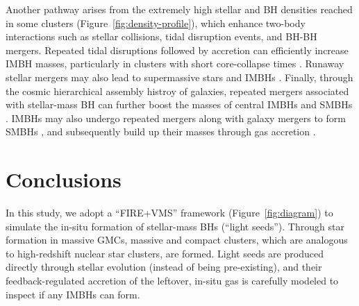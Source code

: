 \documentclass[twocolumn]{aastex631}
\begin{document}
Another pathway arises from the extremely high stellar and BH densities reached in some clusters (Figure~\ref{fig:density-profile}), which enhance two-body interactions such as stellar collisions, tidal disruption events, and BH-BH mergers. Repeated tidal disruptions followed by accretion can efficiently increase IMBH masses, particularly in clusters with short core-collapse times \citep{RantalaNaabLahen_2024MNRAS.531.3770R}. Runaway stellar mergers may also lead to supermassive stars and IMBHs \citep{ReinosoLatifSchleicher_2025A&A...700A..66R}. {Finally, through the cosmic hierarchical assembly histroy of galaxies, repeated mergers associated with stellar-mass BH can further boost the masses of central IMBHs and SMBHs \citep{KritosBeckmannSilk_2025ApJ...991...58K}. IMBHs may also undergo repeated mergers along with galaxy mergers to form SMBHs \citep{BhowmickBlechaTorrey_2025MNRAS.538..518B,BhowmickBlechaTorrey_2026ApJ...997..187B}, and {subsequently} build up their masses through gas accretion \citep[e.g.,][]{ZhouDiMatteoBird_2026ApJ...999...41Z}.
}


\section{Conclusions}
\label{sec:summary}

In this study, we adopt a ``FIRE+VMS'' framework (Figure~\ref{fig:diagram}) to simulate the in-situ formation of stellar-mass BHs (``light seeds''). Through star formation in massive GMCs, massive and compact clusters, which are analogous to high-redshift nuclear star clusters, are formed. Light seeds are produced directly through stellar evolution (instead of being pre-existing), and their feedback-regulated accretion of the leftover, in-situ gas is carefully modeled to inspect if any IMBHs can form. 
\end{document}
